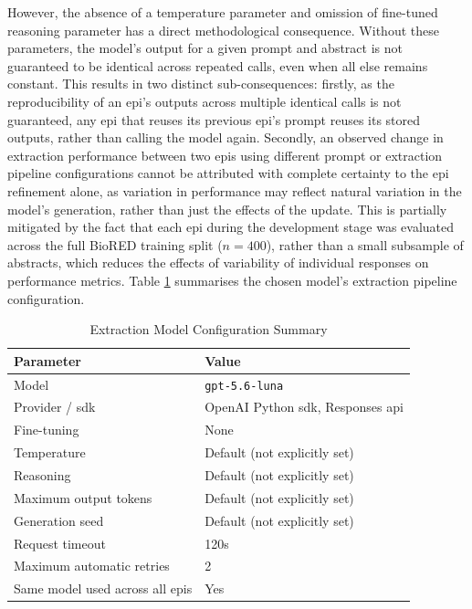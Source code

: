 However, the absence of a temperature parameter and omission of fine-tuned reasoning parameter has a direct methodological consequence. Without these parameters, the model's output for a given prompt and abstract is not guaranteed to be identical across repeated calls, even when all else remains constant. This results in two distinct sub-consequences: firstly, as the reproducibility of an \gls{epi}'s outputs across multiple identical calls is not guaranteed, any \gls{epi} that reuses its previous \gls{epi}'s prompt reuses its stored outputs, rather than calling the model again. Secondly, an observed change in extraction performance between two \gls{epi}s using different prompt or extraction pipeline configurations cannot be attributed with complete certainty to the \gls{epi} refinement alone, as variation in performance may reflect natural variation in the model's generation, rather than just the effects of the update. This is partially mitigated by the fact that each \gls{epi} during the development stage was evaluated across the full BioRED training split ($n = 400$), rather than a small subsample of abstracts, which reduces the effects of variability of individual responses on performance metrics. Table \ref{tab:extraction_model_config_summary} summarises the chosen model's extraction pipeline configuration.

\begin{table}[H]
    \centering
    \caption{Extraction Model Configuration Summary}
    \label{tab:extraction_model_config_summary}
    \begin{tabularx}{\textwidth}{l l}
        \toprule
        Parameter & Value \\
        \midrule
        Model & \verb|gpt-5.6-luna| \\
        Provider / \gls{sdk} & OpenAI Python \gls{sdk}, Responses \gls{api} \\
        Fine-tuning & None \\
        Temperature & Default (not explicitly set) \\
        Reasoning & Default (not explicitly set) \\
        Maximum output tokens & Default (not explicitly set) \\
        Generation seed &  Default (not explicitly set) \\
        Request timeout & 120s \\
        Maximum automatic retries & 2 \\
        Same model used across all \glspl{epi} & Yes \\
        \bottomrule
    \end{tabularx}
\end{table}

